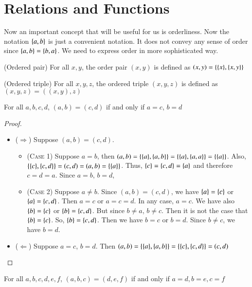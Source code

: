 \section{Relations and Functions}
Now an important concept that will be useful for us is orderliness. Now the notation $\{a,b\}$ is just a convenient notation. It does not convey any sense of order since $\{a,b\} = \{b,a\}$. We need to express order in more sophisticated way. 
\begin{defn}
    {(Ordered pair) For all $x,y$, the order pair $(x,y)$ is defined as $(x,y) = \{\{x\},\{x,y\}\}$}
\end{defn}
\begin{defn}
    {(Ordered triple) For all $x,y,z$, the ordered triple $(x,y,z)$ is defined as $(x,y,z) = ((x,y),z)$}
\end{defn}
\begin{prop}
    For all $a,b,c,d$, $(a,b) = (c,d)$ if and only if $a = c$, $b = d$
\end{prop}
\begin{proof}
    ~
    \begin{itemize}
        \item ($\Rightarrow$) Suppose $(a,b) = (c,d)$.
        \begin{itemize}
            \item (\textsc{Case 1}) Suppose $a = b$, then $(a,b) = \{\{a\},\{a,b\}\} = \{\{a\},\{a,a\}\} = \{\{a\}\}$. Also, $\{\{c\},\{c,d\}\} = (c,d) = (a,b) = \{\{a\}\}$. Thus, $\{c\} = \{c,d\} = \{a\}$ and therefore $c = d = a$. Since $a = b$, $b = d$,
            \item (\textsc{Case 2}) Suppose $a\neq b$. Since $(a,b)= (c,d)$, we have $\{a\} = \{c\}$ or $\{a\} = \{c,d\}$. Then $a = c$ or $a = c = d$. In any case, $a = c$. We have also $\{b\} = \{c\}$ or $\{b\} = \{c,d\}$. But since $b\neq a$, $b\neq c$. Then it is not the case that $\{b\} = \{c\}$. So, $\{b\} = \{c,d\}$. Then we have $b = c$ or $ b = d$. Since $b\neq c$, we have $b = d$.
        \end{itemize}
        \item ($\Leftarrow$) Suppose $a = c$, $b = d$. Then $(a,b) = \{\{a\},\{a,b\}\} = \{\{c\}, \{c,d\}\} = (c,d)$
    \end{itemize}
\end{proof}
\begin{prop}
    {For all $a,b,c,d,e,f$, $(a,b,c) = (d,e,f)$ if and only if $a=d,b=e,c=f$}
\end{prop}
